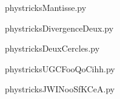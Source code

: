     

    \clearpage
    


    \newcommand{\CaptionFigMantisse}{<+Type your caption here+>}
    \begin{center}
        
    \end{center}
    phystricksMantisse.py

    

    \clearpage
    


    \newcommand{\CaptionFigDivergenceDeux}{<+Type your caption here+>}
    \begin{center}
        
    \end{center}
    phystricksDivergenceDeux.py

    

    \clearpage
    


    \newcommand{\CaptionFigDeuxCercles}{<+Type your caption here+>}
    \begin{center}
        
    \end{center}
    phystricksDeuxCercles.py

    

    \clearpage
    


    \newcommand{\CaptionFigUGCFooQoCihh}{<+Type your caption here+>}
    \begin{center}
        
    \end{center}
    phystricksUGCFooQoCihh.py

    

    \clearpage
    


    \newcommand{\CaptionFigJWINooSfKCeA}{<+Type your caption here+>}
    \begin{center}
        
    \end{center}
    phystricksJWINooSfKCeA.py

    

    \clearpage
    


